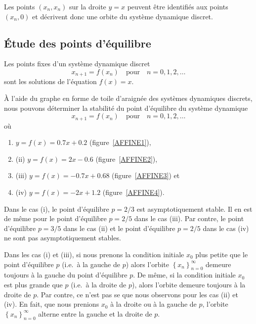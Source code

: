 {Les points $(x_n,x_n)$ sur la droite $y=x$ peuvent être identifiés aux
points $(x_n,0)$ et décrivent donc une orbite du système dynamique
discret.

\subsection{Étude des points d'équilibre}

Les points fixes d'un système dynamique discret
\[
x_{n+1} = f(x_n) \quad \text{pour} \quad n=0, 1, 2, \ldots
\]
sont les solutions de l'équation $f(x) = x$.

\begin{egg}
À l'aide du graphe en forme de toile d'araignée des systèmes
dynamiques discrets, nous pouvons déterminer la stabilité du point
d'équilibre du système dynamique
\[
x_{n+1} = f(x_n) \quad \text{pour} \quad n=0, 1, 2, \ldots
\]
où
{
\renewcommand{\labelenumi}{(\roman{enumi})}
\begin{enumerate}
\item $y = f(x) = 0.7 x + 0.2$ (figure~\ref{AFFINE1}),
\item (ii) $y = f(x) = 2x -0.6$ (figure~\ref{AFFINE2}),
\item (iii) $y = f(x) = -0.7 x + 0.68$ (figure~\ref{AFFINE3}) et
\item (iv) $y = f(x) = -2x +1.2$ (figure~\ref{AFFINE4}).
\end{enumerate}
}

Dans le cas (i), le point d'équilibre $p=2/3$ est asymptotiquement
stable.  Il en est de même pour le point d'équilibre $p=2/5$ dans le
cas (iii).  Par
contre, le point d'équilibre $p=3/5$ dans le cas (ii) et le point
d'équilibre $p=2/5$ dans le cas (iv) ne sont pas asymptotiquement stables.

Dans les cas (i) et (iii), si nous prenons la condition initiale $x_0$
plus petite que le point d'équilibre $p$ (i.e.\ à la gauche de $p$)
alors l'orbite $\displaystyle \left\{x_n\right\}_{n=0}^\infty$ demeure 
toujours à la gauche du point d'équilibre $p$.  De même, si la
condition initiale $x_0$ est plus grande que $p$ (i.e.\ à la droite de
$p$), alors l'orbite demeure toujours à la droite de $p$.  Par contre,
ce n'est pas se que nous observons pour les cas (ii) et (iv).  En
fait, que nous prenions $x_0$ à la droite ou à la gauche de $p$, l'orbite
$\displaystyle \left\{x_n\right\}_{n=0}^\infty$ alterne entre la
gauche et la droite de $p$.
\end{egg}

}
